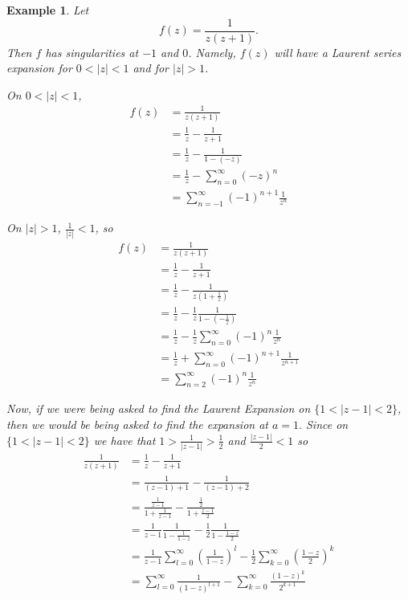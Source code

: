 \documentclass[12pt]{Qual}
\newtheorem{example}{Example}
\begin{document}
\begin{example}
Let $$f(z)=\frac{1}{z(z+1)}.$$ Then $f$ has singularities at $-1$ and $0$. Namely, $f(z)$ will have a Laurent series expansion for $0<|z|<1$ and for $|z|>1$.
\begin{center}
\begin{minipage}{0.4\textwidth}
\vspace{-1.75cm}
On $0<|z|<1$, \begin{align*}
    f(z)&=\frac{1}{z(z+1)}\\
    &=\frac{1}{z}-\frac{1}{z+1}\\
    &=\frac{1}{z}-\frac{1}{1-(-z)}\\
    &=\frac{1}{z}-\sum_{n=0}^\infty(-z)^n\\
    &=\sum_{n=-1}^\infty(-1)^{n+1}\frac{1}{z^n}
\end{align*}
\end{minipage}\begin{minipage}{0.4\textwidth}
\vspace{0.25cm}
On $|z|>1$, $\frac{1}{|z|}<1$, so \begin{align*}
    f(z)&=\frac{1}{z(z+1)}\\
    &=\frac{1}{z}-\frac{1}{z+1}\\
    &=\frac{1}{z}-\frac{1}{z(1+\frac{1}{z})}\\
    &=\frac{1}{z}-\frac{1}{z}\frac{1}{1-\left(-\frac{1}{z}\right)}\\
    &=\frac{1}{z}-\frac{1}{z}\sum_{n=0}^\infty(-1)^n\frac{1}{z^n}\\
    &=\frac{1}{z}+\sum_{n=0}^\infty(-1)^{n+1}\frac{1}{z^{n+1}}\\
    &=\sum_{n=2}^\infty(-1)^n\frac{1}{z^n}
\end{align*}
\end{minipage}
\end{center}

Now, if we were being asked to find the Laurent Expansion on $\{1<|z-1|<2\}$, then we would be being asked to find the expansion at $a=1.$ Since on $\{1<|z-1|<2\}$ we have that $1>\frac{1}{|z-1|}>\frac{1}{2}$ and $\frac{|z-1|}{2}<1$ so \begin{align*}
    \frac{1}{z(z+1)}&=\frac{1}{z}-\frac{1}{z+1}\\
    &=\frac{1}{(z-1)+1}-\frac{1}{(z-1)+2}\\
    &=\frac{\frac{1}{z-1}}{1+\frac{1}{z-1}}-\frac{\frac{1}{2}}{1+\frac{z-1}{2}}\\
    &=\frac{1}{z-1}\frac{1}{1-\frac{1}{1-z}}-\frac{1}{2}\frac{1}{1-\frac{1-z}{2}}\\
    &=\frac{1}{z-1}\sum_{l=0}^\infty\left(\frac{1}{1-z}\right)^l-\frac{1}{2}\sum_{k=0}^\infty\left(\frac{1-z}{2}\right)^k\\
    &=\sum_{l=0}^\infty\frac{1}{(1-z)^{l+1}}-\sum_{k=0}^\infty\frac{(1-z)^k}{2^{k+1}}
\end{align*}
\end{example}
\end{document}
